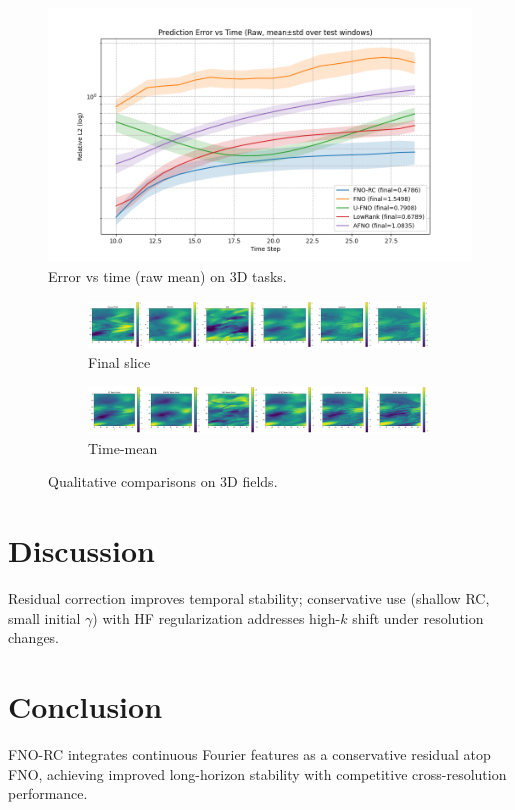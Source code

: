 \documentclass[11pt,twocolumn]{article}
\begin{document}
\begin{figure}[t]
  \centering
  \includegraphics[width=.95\linewidth]{../实验图/error_vs_time_raw_mean.png}
  \caption{Error vs time (raw mean) on 3D tasks.}
  \label{fig:error_time_raw}
\end{figure}

\begin{figure}[t]
  \centering
  \begin{subfigure}{.49\linewidth}
    \centering
    \includegraphics[width=\linewidth]{../实验图/final_slice.png}
    \caption{Final slice}
  \end{subfigure}\hfill
  \begin{subfigure}{.49\linewidth}
    \centering
    \includegraphics[width=\linewidth]{../实验图/mean_time.png}
    \caption{Time-mean}
  \end{subfigure}
  \caption{Qualitative comparisons on 3D fields.}
  \label{fig:qualitative}
\end{figure}

\section{Discussion}
Residual correction improves temporal stability; conservative use (shallow RC, small initial $\gamma$) with HF regularization addresses high-$k$ shift under resolution changes.

\section{Conclusion}
FNO-RC integrates continuous Fourier features as a conservative residual atop FNO, achieving improved long-horizon stability with competitive cross-resolution performance.



\end{document}
